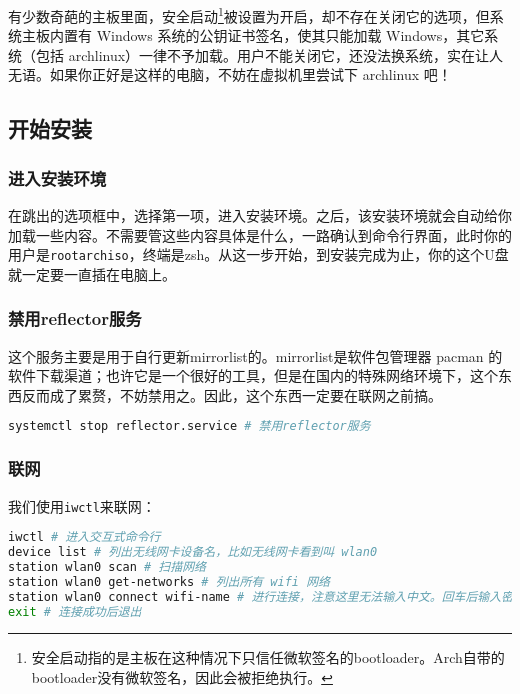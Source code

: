 \begin{note}
  有少数奇葩的主板里面，安全启动\footnote{安全启动指的是主板在这种情况下只信任微软签名的bootloader。Arch自带的bootloader没有微软签名，因此会被拒绝执行。}被设置为开启，却不存在关闭它的选项，但系统主板内置有 Windows 系统的公钥证书签名，使其只能加载 Windows，其它系统（包括 archlinux）一律不予加载。用户不能关闭它，还没法换系统，实在让人无语。如果你正好是这样的电脑，不妨在虚拟机里尝试下 archlinux 吧！
\end{note}

\subsection{开始安装}

\subsubsection{进入安装环境}

在跳出的选项框中，选择第一项，进入安装环境。之后，该安装环境就会自动给你加载一些内容。不需要管这些内容具体是什么，一路确认到命令行界面，此时你的用户是\texttt{root\@ archiso}，终端是zsh。从这一步开始，到安装完成为止，你的这个U盘就一定要一直插在电脑上。

\subsubsection{禁用reflector服务}

这个服务主要是用于自行更新mirrorlist的。mirrorlist是软件包管理器 pacman 的软件下载渠道；也许它是一个很好的工具，但是在国内的特殊网络环境下，这个东西反而成了累赘，不妨禁用之。因此，这个东西一定要在联网之前搞。

\begin{lstlisting}[language=bash]
  systemctl stop reflector.service # 禁用reflector服务
\end{lstlisting}

\subsubsection{联网}

我们使用\texttt{iwctl}来联网：

\begin{lstlisting}[language=bash]
iwctl # 进入交互式命令行
device list # 列出无线网卡设备名，比如无线网卡看到叫 wlan0
station wlan0 scan # 扫描网络
station wlan0 get-networks # 列出所有 wifi 网络
station wlan0 connect wifi-name # 进行连接，注意这里无法输入中文。回车后输入密码即可
exit # 连接成功后退出
\end{lstlisting}

